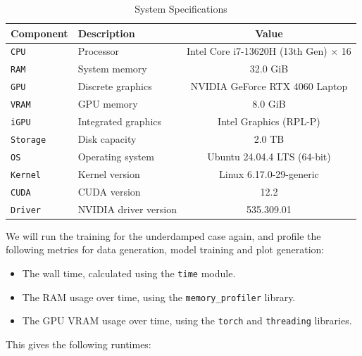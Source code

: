 \documentclass[we,twoside,openright,a4paper,11pt]{uantwerpenbamathesis}
\begin{document}
\begin{table}[H]
\centering
\caption{System Specifications}\label{tab:system_specs}
\begin{tabular}{llc}
\toprule
\textbf{Component} & \textbf{Description} & \textbf{Value} \\
\midrule
\texttt{CPU}        & Processor                   & Intel Core i7-13620H (13th Gen) × 16    \\
\texttt{RAM}        & System memory               & 32.0 GiB                                \\
\texttt{GPU}        & Discrete graphics           & NVIDIA GeForce RTX 4060 Laptop          \\
\texttt{VRAM}       & GPU memory                  & 8.0 GiB                                 \\
\texttt{iGPU}       & Integrated graphics         & Intel Graphics (RPL-P)                  \\
\texttt{Storage}    & Disk capacity               & 2.0 TB                                  \\
\texttt{OS}         & Operating system            & Ubuntu 24.04.4 LTS (64-bit)             \\
\texttt{Kernel}     & Kernel version              & Linux 6.17.0-29-generic                 \\
\texttt{CUDA}       & CUDA version                & 12.2                                    \\
\texttt{Driver}     & NVIDIA driver version       & 535.309.01                              \\
\bottomrule
\end{tabular}
\end{table}

We will run the training for the underdamped case again, and profile the following metrics for data generation, model training and plot generation:
\begin{itemize}
    \item The wall time, calculated using the \verb|time| module.
    \item The RAM usage over time, using the \verb|memory_profiler| library.
    \item The GPU VRAM usage over time, using the \verb|torch| and \verb|threading| libraries.
\end{itemize}
This gives the following runtimes:
\end{document}
